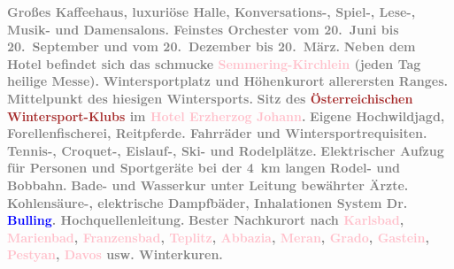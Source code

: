            \pstart
           \noindent{}\centering{}\textcolor{gray}{\textbf{Großes Kaffeehaus, luxuriöse Halle, Konversations-, Spiel-,
                        Lese-, Musik- und Damensalons. Feinstes Orchester vom 20. Juni bis
                        20. September und vom 20. Dezember bis 20. März.}}\pend
           \pstart
           \noindent{}\centering{}\textcolor{gray}{\textbf{Neben dem Hotel befindet sich das schmucke \textcolor{pink}{Semmering-Kirchlein}{}\ledrightnote{\textcolor{pink}{Kirche zur heiligen Familie}} (jeden Tag heilige Messe).}}\pend
           \pstart
           \noindent{}\centering{}\textcolor{gray}{\textbf{Wintersportplatz und Höhenkurort allerersten Ranges.}}\pend
           \pstart
           \noindent{}\centering{}\textcolor{gray}{\textbf{Mittelpunkt des hiesigen Wintersports.}}\pend
           \pstart
           \noindent{}\centering{}\textcolor{gray}{\textbf{Sitz des \textcolor{brown}{Österreichischen
                            Wintersport-Klubs}{}\ledrightnote{\textcolor{brown}{Österreichischer Wintersport-Klub}} im \textcolor{pink}{Hotel Erzherzog
                            Johann}{}\ledrightnote{\textcolor{pink}{Hotel Erzherzog Johann}}.}}\pend
           \pstart
           \noindent{}\centering{}\textcolor{gray}{\textbf{Eigene Hochwildjagd, Forellenfischerei, Reitpferde.
                        Fahrräder und Wintersportrequisiten.}}\pend
           \pstart
           \noindent{}\centering{}\textcolor{gray}{\textbf{Tennis-, Croquet-, Eislauf-, Ski- und Rodelplätze.}}\pend
           \pstart
           \noindent{}\centering{}\textcolor{gray}{\textbf{Elektrischer Aufzug für Personen und Sportgeräte bei der
                        4 km langen Rodel- und Bobbahn.}}\pend
           \pstart
           \noindent{}\centering{}\textcolor{gray}{\textbf{Bade- und Wasserkur unter Leitung bewährter Ärzte.
                        Kohlensäure-, elektrische Dampfbäder, Inhalationen System Dr. \textcolor{blue}{Bulling}{}\ledrightnote{\textcolor{blue}{Anton Bulling}}. Hochquellenleitung.}}\pend
           \pstart
           \noindent{}\centering{}\textcolor{gray}{\textbf{Bester Nachkurort nach \textcolor{pink}{Karlsbad}{}\ledrightnote{\textcolor{pink}{Karlsbad}}, \textcolor{pink}{Marienbad}{}\ledrightnote{\textcolor{pink}{Marienbad}}, \textcolor{pink}{Franzensbad}{}\ledrightnote{\textcolor{pink}{Franzensbad}}, \textcolor{pink}{Teplitz}{}\ledrightnote{\textcolor{pink}{Teplice}}, \textcolor{pink}{Abbazia}{}\ledrightnote{\textcolor{pink}{Opatija}}, \textcolor{pink}{Meran}{}\ledrightnote{\textcolor{pink}{Opatija}}, \textcolor{pink}{Grado}{}\ledrightnote{\textcolor{pink}{Grado}}, \textcolor{pink}{Gastein}{}\ledrightnote{\textcolor{pink}{Bad Gastein}}, \textcolor{pink}{Pestyan}{}\ledrightnote{\textcolor{pink}{Piešťany}}, \textcolor{pink}{Davos}{}\ledrightnote{\textcolor{pink}{Davos}} usw.
                        Winterkuren.}}\pend
